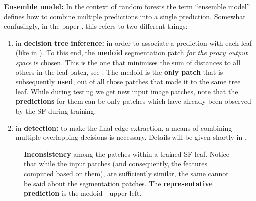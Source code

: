 \textbf{Ensemble model:} In the context of random forests the term ``ensemble model'' defines how to combine multiple predictions into a single prediction. Somewhat confusingly, %
in the paper \cite{DollarICCV13edges}, this refers to two different things:
\begin{enumerate}
 \item{in {\bf decision tree inference:}} in order to associate a prediction with each leaf (like in ). 
 To this end, the {\bf medoid} segmentation patch \textit{for the proxy output space} is chosen. This is the one that minimises the sum of distances to all others in the leaf patch, see . The medoid is the {\bf only patch} that is subsequently {\bf used}, out of all those patches that made it to the same tree leaf. 
 While during testing we get new input image patches, note that the {\bf predictions} for them can be only patches which have already been observed by the SF during training. %
 \item{in {\bf detection:}} to make the final edge extraction, a means of combining multiple overlapping decisions is necessary. Details will be given shortly in .
\end{enumerate}

\begin{figure}[t]
\centering
\caption[Inconsistency among the patches within a trained SF leaf]{{\bf Inconsistency} among the patches within a trained SF leaf. Notice that while the input patches (and consequently, the features computed based on them), are sufficiently similar, the same cannot be said about the segmentation patches. The {\bf representative prediction} is the medoid - upper left.}
\label{fig:srf-leaf}
\end{figure}


